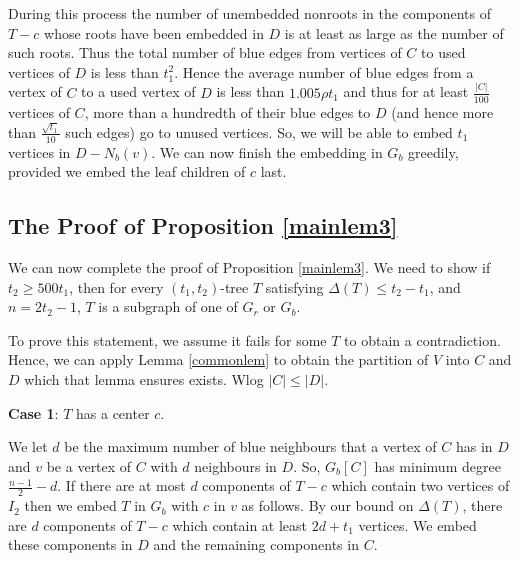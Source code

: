 \documentclass[11pt]{article}
\begin{document}
During this process the number of unembedded nonroots in the components of $T-c$  whose roots have 
been embedded in  $D$ is at least as large as the number of such roots. 
Thus the total number of blue edges from vertices of $C$ to used vertices of $D$ is less than  $t_1^2$.
Hence the average number of blue edges from a vertex of $C$ to a used vertex of $D$ is less than 
$1.005\rho t_1$ and thus for at least $\frac{|C|}{100}$ vertices of   $C$, more than  a hundredth of their
blue edges  to $D$ (and hence more than $\frac{\sqrt{t_1}}{10}$ such edges)  go to unused vertices. 
So, we will be able to embed $t_1$ vertices in $D-N_b(v)$. We can now finish the embedding in $G_b$ greedily, 
provided we embed the leaf children of $c$ last. 


















\subsection{The Proof of Proposition  \ref{mainlem3}}

We can now complete the proof of Proposition \ref{mainlem3}.
We need to show if    $t_2 \ge 500t_1$, then for every $(t_1,t_2)$-tree $T$ satisfying 
     $\Delta(T) \le t_2-t_1$,  and $n=2t_2-1$, $T$ is a subgraph of one of $G_r$ or $G_b$. 



To prove this statement, we assume it fails  for some $T$  to obtain a contradiction. Hence, we can apply Lemma \ref{commonlem} to obtain the 
partition of $V$ into $C$ and $D$ which that  lemma ensures  exists. Wlog $|C| \le |D|$.



{\bf Case 1}: $T$ has a center $c$. 

We let $d$ be the maximum number of blue neighbours that a vertex of $C$ has in $D$ and $v$ be a vertex of $C$ with $d$ neighbours in $D$.
So, $G_b[C]$
has minimum degree $\frac{n-1}{2}-d$. If there are at most $d$ components of $T-c$ which contain 
two vertices of  $I_2$ then we embed $T$ in $G_b$ with $c$ in $v$ as follows.  By our bound on $\Delta(T)$, there are $d$ components of $T-c$ which  contain at least $2d+t_1$ vertices. We embed these components in $D$ and the remaining components in
$C$. 
\end{document}
